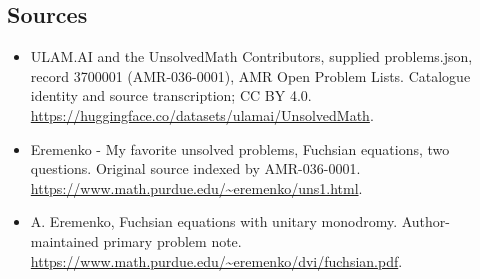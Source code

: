 \documentclass[11pt,a4paper]{article}
\begin{document}
\subsection{Sources}
\begin{itemize}
\item[S1] ULAM.AI and the UnsolvedMath Contributors, supplied problems.json, record 3700001 (AMR-036-0001), AMR Open Problem Lists. Catalogue identity and source transcription; CC BY 4.0.
\url{https://huggingface.co/datasets/ulamai/UnsolvedMath}.
\item[S2] Eremenko - My favorite unsolved problems, Fuchsian equations, two questions. Original source indexed by AMR-036-0001.
\url{https://www.math.purdue.edu/~eremenko/uns1.html}.
\item[S3] A. Eremenko, Fuchsian equations with unitary monodromy. Author-maintained primary problem note.
\url{https://www.math.purdue.edu/~eremenko/dvi/fuchsian.pdf}.
\end{itemize}
\end{document}
